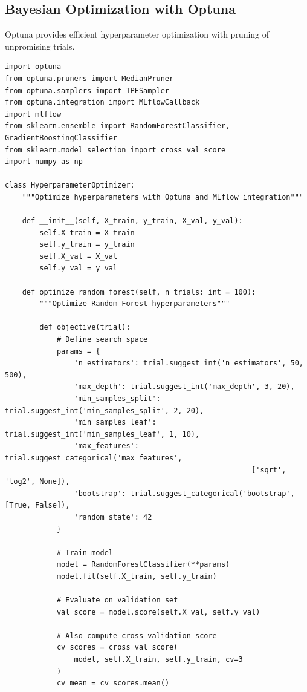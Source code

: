 \subsection{Bayesian Optimization with Optuna}

Optuna provides efficient hyperparameter optimization with pruning of unpromising trials.

\begin{lstlisting}[style=python, caption=Advanced hyperparameter optimization with Optuna]
import optuna
from optuna.pruners import MedianPruner
from optuna.samplers import TPESampler
from optuna.integration import MLflowCallback
import mlflow
from sklearn.ensemble import RandomForestClassifier, GradientBoostingClassifier
from sklearn.model_selection import cross_val_score
import numpy as np

class HyperparameterOptimizer:
    """Optimize hyperparameters with Optuna and MLflow integration"""

    def __init__(self, X_train, y_train, X_val, y_val):
        self.X_train = X_train
        self.y_train = y_train
        self.X_val = X_val
        self.y_val = y_val

    def optimize_random_forest(self, n_trials: int = 100):
        """Optimize Random Forest hyperparameters"""

        def objective(trial):
            # Define search space
            params = {
                'n_estimators': trial.suggest_int('n_estimators', 50, 500),
                'max_depth': trial.suggest_int('max_depth', 3, 20),
                'min_samples_split': trial.suggest_int('min_samples_split', 2, 20),
                'min_samples_leaf': trial.suggest_int('min_samples_leaf', 1, 10),
                'max_features': trial.suggest_categorical('max_features',
                                                         ['sqrt', 'log2', None]),
                'bootstrap': trial.suggest_categorical('bootstrap', [True, False]),
                'random_state': 42
            }

            # Train model
            model = RandomForestClassifier(**params)
            model.fit(self.X_train, self.y_train)

            # Evaluate on validation set
            val_score = model.score(self.X_val, self.y_val)

            # Also compute cross-validation score
            cv_scores = cross_val_score(
                model, self.X_train, self.y_train, cv=3
            )
            cv_mean = cv_scores.mean()


\end{lstlisting}
